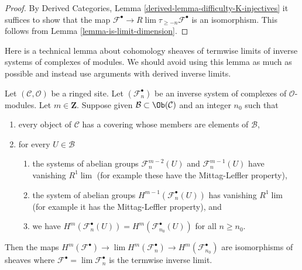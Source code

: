 \begin{proof}
By Derived Categories, Lemma \ref{derived-lemma-difficulty-K-injectives}
it suffices to show that the map
$\mathcal{F}^\bullet \to R\lim \tau_{\geq -n} \mathcal{F}^\bullet$
is an isomorphism. This follows from Lemma \ref{lemma-is-limit-dimension}.
\end{proof}

\noindent
Here is a technical lemma about cohomology sheaves of termwise limits of
inverse systems of complexes of modules. We should avoid using this lemma
as much as possible and instead use arguments with derived inverse
limits.

\begin{lemma}
\label{lemma-inverse-limit-complexes}
Let $(\mathcal{C}, \mathcal{O})$ be a ringed site. Let
$(\mathcal{F}_n^\bullet)$ be an inverse system of complexes of
$\mathcal{O}$-modules. Let $m \in \mathbf{Z}$. Suppose given
$\mathcal{B} \subset \Ob(\mathcal{C})$ and an integer
$n_0$ such that
\begin{enumerate}
\item every object of $\mathcal{C}$ has a covering whose members are
elements of $\mathcal{B}$,
\item for every $U \in \mathcal{B}$
\begin{enumerate}
\item the systems of abelian groups
$\mathcal{F}_n^{m - 2}(U)$ and $\mathcal{F}_n^{m - 1}(U)$
have vanishing $R^1\lim$ (for example these have the Mittag-Leffler property),
\item the system of abelian groups $H^{m - 1}(\mathcal{F}_n^\bullet(U))$
has vanishing $R^1\lim$ (for example it has the Mittag-Leffler property), and
\item we have
$H^m(\mathcal{F}_n^\bullet(U)) = H^m(\mathcal{F}_{n_0}^\bullet(U))$
for all $n \geq n_0$.
\end{enumerate}
\end{enumerate}
Then the maps $H^m(\mathcal{F}^\bullet) \to \lim H^m(\mathcal{F}_n^\bullet)
\to H^m(\mathcal{F}_{n_0}^\bullet)$ are isomorphisms of sheaves where
$\mathcal{F}^\bullet = \lim \mathcal{F}_n^\bullet$ is the termwise
inverse limit. 
\end{lemma}

